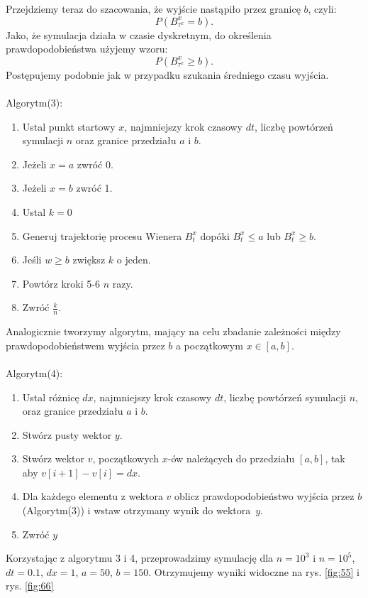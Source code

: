 \documentclass{article}
\theoremstyle{break}
\numberwithin{equation}{subsection}
\numberwithin{figure}{section}
\begin{document}
Przejdziemy teraz do szacowania, że wyjście nastąpiło przez granicę $b$, czyli:
$$P(B_{\tau^x}^x=b).$$
Jako, że symulacja działa w czasie dyskretnym, do określenia prawdopodobieństwa użyjemy wzoru:
$$P(B_{\tau^x}^x\geq b).$$
Postępujemy podobnie jak w przypadku szukania średniego czasu wyjścia.\\ \\
Algorytm(3):
\begin{enumerate}
	\item Ustal punkt startowy $x$, najmniejszy krok czasowy $dt$, liczbę powtórzeń symulacji $n$  oraz granice przedziału $a$ i $b$.
	\item Jeżeli $x=a$ zwróć 0.
	\item Jeżeli $x=b$ zwróć 1.
	\item Ustal $k=0$ 
	\item Generuj trajektorię procesu Wienera $B_t^x$ dopóki $B_t^x\leq a$ lub $B_t^x\geq b$.
	\item Jeśli $w\geq b$ zwiększ $k$ o jeden.
	\item Powtórz kroki 5-6 $n$ razy.
	\item Zwróć $\frac{k}{n}$.
\end{enumerate}
Analogicznie tworzymy algorytm, mający na celu zbadanie zależności między prawdopodobieństwem wyjścia przez $b$ a początkowym $x\in [a,b]$.\\ \\ 
Algorytm(4):
\begin{enumerate}
	\item Ustal różnicę $dx$, najmniejszy krok czasowy $dt$, liczbę powtórzeń symulacji $n$, oraz granice przedziału $a$ i $b$.
	\item Stwórz pusty wektor $y$.
	\item Stwórz wektor $v$, początkowych $x$-ów należących do przedziału $[a,b]$, tak aby $v[i+1]-v[i]=dx$.
	\item Dla każdego elementu z wektora $v$ oblicz prawdopodobieństwo wyjścia przez $b$ (Algorytm(3)) i wstaw otrzymany wynik do wektora~$y$.
	\item Zwróć $y$
\end{enumerate}
Korzystając z algorytmu 3 i 4, przeprowadzimy symulację dla $n=10^3$ i $n=10^5$, $dt=0.1$, $dx=1$, $a=50$, $b=150$. Otrzymujemy wyniki widoczne na rys. \ref{fig:55} i rys. \ref{fig:66}
\end{document}
